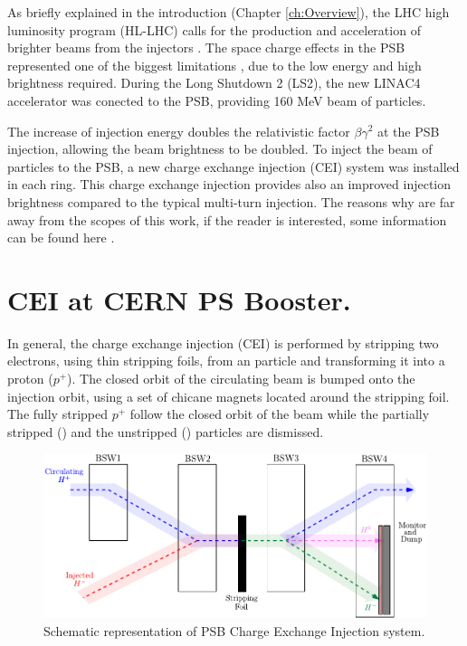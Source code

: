 \pagestyle{fancy}

\graphicspath{ {Figures/Chapter9_H0Hm/} }

As briefly explained in the introduction (Chapter \ref{ch:Overview}), the LHC high luminosity program (HL-LHC) \parencite[][]{ref:HL-LHC} calls for the production and acceleration of brighter beams from the injectors \parencite[][]{ref:InjectorsUpgrade}. The space charge effects in the PSB represented one of the biggest limitations \parencite[][]{ref:ChargeEffect}, due to the low energy and high brightness required. During the Long Shutdown 2 (LS2), the new LINAC4 accelerator was conected to the PSB, providing 160 MeV \hm beam of particles. 

The increase of injection energy doubles the relativistic factor $\beta \gamma^2$ at the PSB injection, allowing the beam brightness to be doubled. To inject the \hm beam of particles to the PSB, a new charge exchange injection (CEI) system \parencite[][]{ref:ChargeExchange} was installed in each ring. This charge exchange injection provides also an improved injection brightness compared to the typical multi-turn injection. The reasons why are far away from the scopes of this work, if the reader is interested, some information can be found here \parencite[][]{ref:liuvilleviolation}.

\section{CEI at CERN PS Booster.}
\label{sec:CEI}

In general, the charge exchange injection (CEI) is performed by stripping two electrons, using thin stripping foils,  from an \hm particle and transforming it into a proton ($p^{+}$).  The closed orbit of the circulating beam is bumped onto the injection orbit, using a set of chicane magnets located around the stripping foil. The fully stripped $p^{+}$ follow the closed orbit of the beam while the partially stripped (\hzz) and the unstripped (\hm) particles are dismissed. 

\begin{figure}[h]
    \centering
    \includegraphics[width=0.75\columnwidth]{Figure_ChargeExchangeSchema/ChargeExSchema.pdf}
    \caption{Schematic representation of PSB \hm Charge Exchange Injection system. }
    \label{fig:SchemaCEI}
\end{figure}

